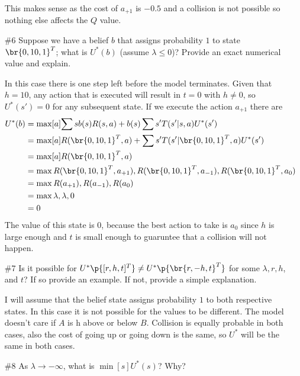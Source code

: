 \documentclass[12pt, oneside]{article}
\begin{document}
\begin{enumerate}
    This makes sense as the cost of $a_{+1}$ is $-0.5$ and a collision is not
    possible so nothing else affects the $Q$ value.

  \item[\#6] %
    Suppose we have a belief $b$ that assigns probability $1$ to state
    $\br{0, 10, 1}^T$; what is $U^*(b)$ (assume $\lambda \le 0$)?
    Provide an exact numerical value and explain.

    In this case there is one step left before the model terminates.
    Given that $h = 10$, any action that is executed will result in $t = 0$ with
    $h \neq 0$, so $U^*(s') = 0$ for any subsequent state.
    If we execute the action $a_{+1}$ there are 
    \begin{align*}
      U^*(b) &= \max[a]{\sum{s}{}{b(s)R(s, a) + b(s)\sum{s'}{}{T(s'|s,a)U^*(s')}}} \\
      &= \max[a]{R(\br{0, 10, 1}^T, a) + \sum{s'}{}{T(s'|\br{0, 10, 1}^T,a)U^*(s')}} \\
      &= \max[a]{R(\br{0, 10, 1}^T, a)} \\
      &= \max{R(\br{0, 10, 1}^T, a_{+1}),R(\br{0, 10, 1}^T, a_{-1}), R(\br{0, 10, 1}^T, a_{0})} \\
      &= \max{R(a_{+1}),R(a_{-1}), R(a_{0})} \\
      &= \max{\lambda,\lambda, 0} \\
      &= 0 \\
    \end{align*}
    The value of this state is $0$, because the best action to take is $a_0$
    since $h$ is large enough and $t$ is small enough to guaruntee that a
    collision will not happen.

  \item[\#7] %
    Is it possible for $U^*\p{[r, h, t]^T} \neq U^*\p{\br{r, -h, t}^T}$ for some
    $\lambda, r, h$, and $t$?
    If so provide an example.
    If not, provide a simple explanation.

    I will assume that the belief state assigns probability $1$ to both
    respective states.
    In this case it is not possible for the values to be different.
    The model doesn't care if $A$ is h above or below $B$.
    Collision is equally probable in both cases, also the cost of going up or going down
    is the same, so $U^*$ will be the same in both cases.

  \item[\#8] %
    As $\lambda \to -\infty$, what is $\min[s]{U^*(s)}$?
    Why?


\end{enumerate}
\end{document}
